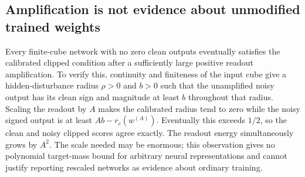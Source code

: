 \subsection{Amplification is not evidence about unmodified trained weights}

Every finite-cube network with no zero clean outputs eventually satisfies
the calibrated clipped condition after a sufficiently large positive
readout amplification. To verify this, continuity and finiteness of the
input cube give a hidden-disturbance radius $\rho>0$ and $b>0$ such that
the unamplified noisy output has its clean sign and magnitude at least $b$
throughout that radius. Scaling the readout by $A$ makes the calibrated
radius tend to zero while the noisy signed output is at least
$Ab-r_c(w^{(A)})$. Eventually this exceeds $1/2$, so the clean and noisy
clipped scores agree exactly. The readout energy simultaneously grows by
$A^2$. The scale needed may be enormous; this observation gives no
polynomial target-mass bound for arbitrary neural representations and
cannot justify reporting rescaled networks as evidence about ordinary
training.
